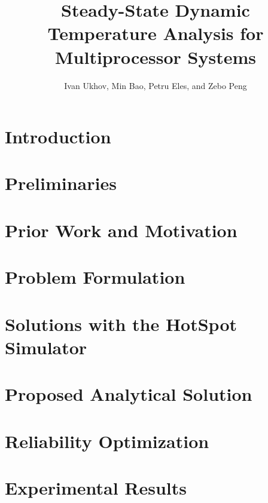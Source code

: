 \documentclass[conference]{IEEEtran}
\title{Steady-State Dynamic Temperature Analysis for Multiprocessor Systems}
\author{Ivan Ukhov, Min Bao, Petru Eles, and Zebo Peng}
\begin{document}
  \maketitle

  \begin{abstract}
    
  \end{abstract}

  \section{Introduction}
  

  \section{Preliminaries} \label{sec:preliminaries}
  

  \section{Prior Work and Motivation} \label{sec:motivation}
  

  \section{Problem Formulation} \label{sec:problem}
  

  \section{Solutions with the HotSpot Simulator} \label{sec:hotspot-solution}
  

  \section{Proposed Analytical Solution} \label{sec:analytical-solution}
  

  \section{Reliability Optimization} \label{sec:reliability}
  

  \section{Experimental Results} \label{sec:results}
  
\end{document}
